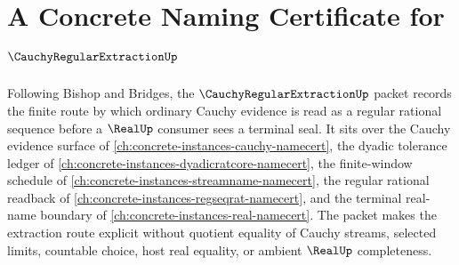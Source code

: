 \chapter{A Concrete Naming Certificate for $\CauchyRegularExtractionUp$}
\label{ch:concrete-instances-cauchy-regular-extraction-namecert}

Following Bishop and Bridges, the $\CauchyRegularExtractionUp$ packet records the finite route by which ordinary Cauchy evidence is read as a regular rational sequence before a $\RealUp$ consumer sees a terminal seal. It sits over the Cauchy evidence surface of \autoref{ch:concrete-instances-cauchy-namecert}, the dyadic tolerance ledger of \autoref{ch:concrete-instances-dyadicratcore-namecert}, the finite-window schedule of \autoref{ch:concrete-instances-streamname-namecert}, the regular rational readback of \autoref{ch:concrete-instances-regseqrat-namecert}, and the terminal real-name boundary of \autoref{ch:concrete-instances-real-namecert}. The packet makes the extraction route explicit without quotient equality of Cauchy streams, selected limits, countable choice, host real equality, or ambient $\RealUp$ completeness.

